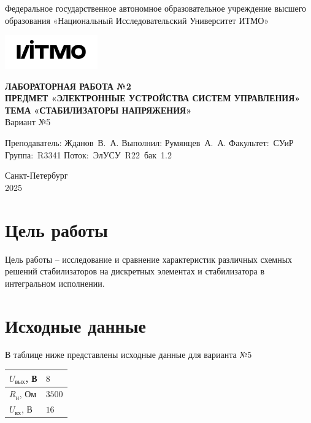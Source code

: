 \documentclass[a4paper, 12pt]{article}
\begin{document}
    \begin{titlepage}

        \begin{center}
        Федеральное государственное автономное образовательное учреждение высшего образования
        «Национальный Исследовательский Университет ИТМО»
        \vfill
        
        \includegraphics[width=0.3\textwidth]{itmo.png} %

        {\large\bf ЛАБОРАТОРНАЯ РАБОТА №2}\\
        {\large\bf ПРЕДМЕТ «ЭЛЕКТРОННЫЕ УСТРОЙСТВА СИСТЕМ УПРАВЛЕНИЯ»}\\
        {\large\bf ТЕМА «СТАБИЛИЗАТОРЫ НАПРЯЖЕНИЯ»}\\
        Вариант №5
        \vfill

        \begin{flushright}
            \begin{minipage}{.45\textwidth}
            {
                \hbox{Преподаватель:}
                \hbox{Жданов В. А.}
                \hbox{}
                \hbox{Выполнил:}
                \hbox{Румянцев А. А.}
                \hbox{}
                \hbox{Факультет: СУиР}
                \hbox{Группа: R3341}
                \hbox{Поток: ЭлУСУ R22 бак 1.2}
            }
            \end{minipage}
        \end{flushright}
        \vfill
  
        Санкт-Петербург\\
        2025
        \end{center}
    \end{titlepage}
    
    \tableofcontents

    \newpage
    \section{Цель работы}
    Цель работы -- исследование и сравнение характеристик различных схемных решений
    стабилизаторов на дискретных элементах и стабилизатора в интегральном исполнении.


    \section{Исходные данные}
    В таблице ниже представлены исходные данные для варианта №5
    \begin{center}
        \begin{tabular}{ | m{4em} | m{2em}| } 
        \hline
        $U_{\text{вых}}$, В& $8$\\ 
        \hline
        $R_{\text{н}}$, Ом& $3500$\\ 
        \hline
        $U_{\text{вх}}$, В& $16$\\ 
        \hline
        \end{tabular}
    \end{center}
\end{document}

